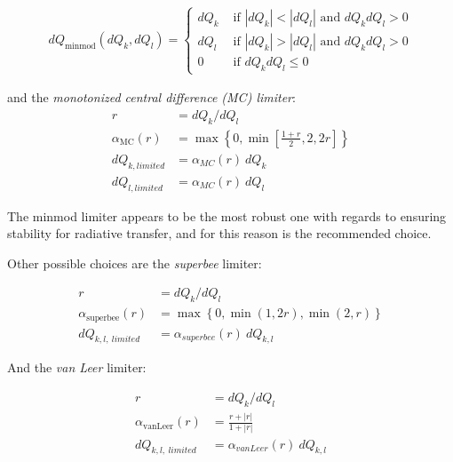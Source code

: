 \begin{align}
    dQ_{\text{minmod}}(dQ_k, dQ_l) =
    \begin{cases}
      dQ_k      & \text{ if } |dQ_k| < |dQ_l| \text{ and } dQ_k dQ_l > 0 \\
      dQ_l      & \text{ if } |dQ_k| > |dQ_l| \text{ and } dQ_k dQ_l > 0 \\
      0         & \text{ if }  dQ_k dQ_l \leq 0
    \end{cases} \label{eq:rt-minmod}
\end{align}

and the \emph{monotonized central difference (MC) limiter}:
\begin{align}
	r &= dQ_k / dQ_l \nonumber \\
	\alpha_{\text{MC}}(r) &= \max \left\{ 0, \min\left[\frac{1 + r}{2}, 2, 2r \right] \right\}
	\label{eq:rt-MC}\\
	dQ_{k, limited} &= \alpha_{MC}(r)\ dQ_k \nonumber\\
	dQ_{l, limited} &= \alpha_{MC}(r)\ dQ_l \nonumber
\end{align}


The minmod limiter appears to be the most robust one with regards to ensuring stability for
radiative transfer, and for this reason is the recommended choice.


Other possible choices are the \emph{superbee} limiter:

\begin{align}
	r &= dQ_k / dQ_l \nonumber \\
	\alpha_{\text{superbee}}(r) &= \max \left\{ 0,  \min (1, 2r), \min(2, r) \right\}
	\label{eq:rt-superbee}\\
	dQ_{k,l,\ limited} &= \alpha_{superbee}(r)\ dQ_{k,l} \nonumber
\end{align}


And the \emph{van Leer} limiter:

\begin{align}
	r &= dQ_k / dQ_l \nonumber\\
	\alpha_{\text{vanLeer}}(r) &= \frac{r + |r|}{1 + |r|}
	\label{eq:rt-vanLeer}\\
	dQ_{k,l,\ limited} &= \alpha_{vanLeer}(r)\ dQ_{k,l} \nonumber
\end{align}








